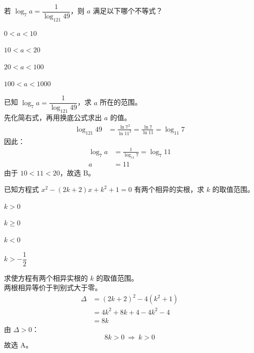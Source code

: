 \documentclass[12pt,a4paper]{exam-zh}
\begin{document}
\begin{question}
    若 $\log_{7}a=\dfrac{1}{\log_{121}49}$，则 $a$ 满足以下哪个不等式？\paren[B]
    \begin{choices}
        \item $0<a<10$
        \item $10<a<20$
        \item $20<a<100$
        \item $100<a<1000$
    \end{choices}
\end{question}

\begin{solution}
    已知 $\log_{7}a=\dfrac{1}{\log_{121}49}$，求 $a$ 所在的范围。 \\
    先化简右式，再用换底公式求出 $a$ 的值。
    \begin{align*}
        \log_{121}49 &= \frac{\ln 7^{2}}{\ln 11^{2}} = \frac{\ln 7}{\ln 11} = \log_{11}7
    \end{align*}
    因此：
    \begin{align*}
        \log_{7}a &= \frac{1}{\log_{11}7} = \log_{7}11 \\
        a &= 11
    \end{align*}
    由于 $10<11<20$，故选 B。
\end{solution}

\begin{question}
    已知方程式 $x^{2}-(2k+2)x+k^{2}+1=0$ 有两个相异的实根，求 $k$ 的取值范围。\paren[A]
    \begin{choices}
        \item $k>0$
        \item $k\geq0$
        \item $k<0$
        \item $k>-\dfrac{1}{2}$
    \end{choices}
\end{question}

\begin{solution}
    求使方程有两个相异实根的 $k$ 的取值范围。 \\
    两根相异等价于判别式大于零。
    \begin{align*}
        \Delta &= (2k+2)^{2}-4(k^{2}+1) \\
        &= 4k^{2}+8k+4-4k^{2}-4 \\
        &= 8k
    \end{align*}
    由 $\Delta>0$：
    \[
        8k>0 \ \Rightarrow \ k>0
    \]
    故选 A。
\end{solution}
\end{document}
